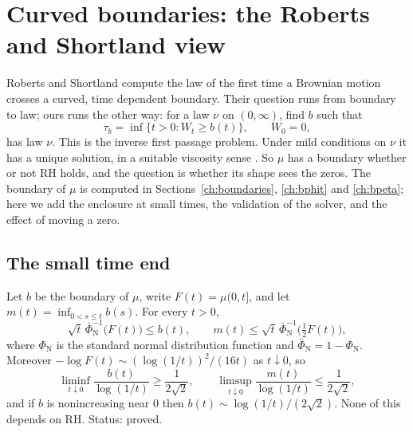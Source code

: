\section{Curved boundaries: the Roberts and Shortland view}\label{ht:sec:rs}

Roberts and Shortland \cite{RS95} compute the law of the first time a Brownian motion crosses a curved, time dependent boundary. Their question runs from boundary to law; ours runs the other way: for a law $\nu$ on $(0,\infty)$, find $b$ such that
\[
\tau_b=\inf\{t>0: W_t\ge b(t)\},\qquad W_0=0,
\]
has law $\nu$. This is the inverse first passage problem. Under mild conditions on $\nu$ it has a unique solution, in a suitable viscosity sense \cite{Anulova80,CCCS11}. So $\mu$ has a boundary whether or not RH holds, and the question is whether its shape sees the zeros. The boundary of $\mu$ is computed in Sections~\ref{ch:boundaries}, \ref{ch:bphit} and \ref{ch:bpeta}; here we add the enclosure at small times, the validation of the solver, and the effect of moving a zero.

\subsection{The small time end}

\begin{proposition}\label{ht:prop:smallb}
Let $b$ be the boundary of $\mu$, write $F(t)=\mu(0,t]$, and let $m(t)=\inf_{0<s\le t}b(s)$. For every $t>0$,
\[
\sqrt t\,\bar\Phi_{\mathrm N}^{-1}\big(F(t)\big)\le b(t),\qquad m(t)\le\sqrt t\,\bar\Phi_{\mathrm N}^{-1}\big(\tfrac12F(t)\big),
\]
where $\Phi_{\mathrm N}$ is the standard normal distribution function and $\bar\Phi_{\mathrm N}=1-\Phi_{\mathrm N}$. Moreover $-\log F(t)\sim(\log(1/t))^2/(16t)$ as $t\downarrow0$, so
\[
\liminf_{t\downarrow0}\frac{b(t)}{\log(1/t)}\ge\frac1{2\sqrt2},\qquad \limsup_{t\downarrow0}\frac{m(t)}{\log(1/t)}\le\frac1{2\sqrt2},
\]
and if $b$ is nonincreasing near $0$ then $b(t)\sim\log(1/t)/(2\sqrt2)$. None of this depends on RH. Status: proved.
\end{proposition}

